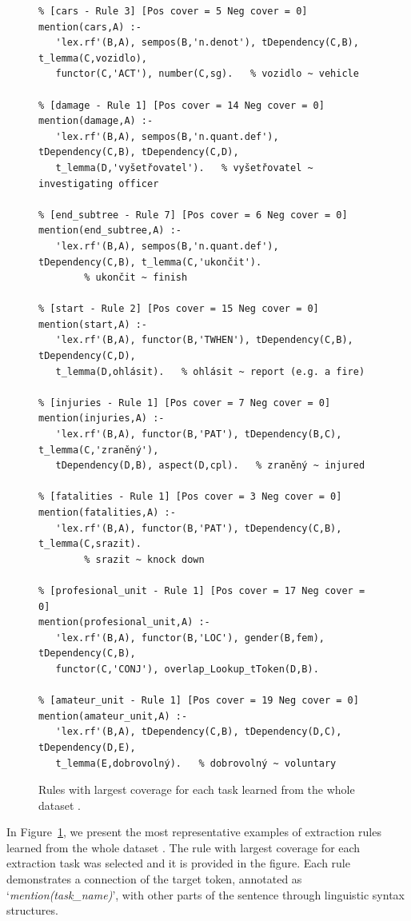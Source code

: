 \begin{figure}
\begin{verbatim}
% [cars - Rule 3] [Pos cover = 5 Neg cover = 0]
mention(cars,A) :-
   'lex.rf'(B,A), sempos(B,'n.denot'), tDependency(C,B), t_lemma(C,vozidlo), 
   functor(C,'ACT'), number(C,sg).   % vozidlo ~ vehicle

% [damage - Rule 1] [Pos cover = 14 Neg cover = 0]
mention(damage,A) :-
   'lex.rf'(B,A), sempos(B,'n.quant.def'), tDependency(C,B), tDependency(C,D), 
   t_lemma(D,'vyšetřovatel').   % vyšetřovatel ~ investigating officer

% [end_subtree - Rule 7] [Pos cover = 6 Neg cover = 0]
mention(end_subtree,A) :-
   'lex.rf'(B,A), sempos(B,'n.quant.def'), tDependency(C,B), t_lemma(C,'ukončit').
	    % ukončit ~ finish

% [start - Rule 2] [Pos cover = 15 Neg cover = 0]
mention(start,A) :-
   'lex.rf'(B,A), functor(B,'TWHEN'), tDependency(C,B), tDependency(C,D), 
   t_lemma(D,ohlásit).   % ohlásit ~ report (e.g. a fire)

% [injuries - Rule 1] [Pos cover = 7 Neg cover = 0]
mention(injuries,A) :-
   'lex.rf'(B,A), functor(B,'PAT'), tDependency(B,C), t_lemma(C,'zraněný'), 
   tDependency(D,B), aspect(D,cpl).   % zraněný ~ injured

% [fatalities - Rule 1] [Pos cover = 3 Neg cover = 0]
mention(fatalities,A) :-
   'lex.rf'(B,A), functor(B,'PAT'), tDependency(C,B), t_lemma(C,srazit).
	    % srazit ~ knock down

% [profesional_unit - Rule 1] [Pos cover = 17 Neg cover = 0]
mention(profesional_unit,A) :-
   'lex.rf'(B,A), functor(B,'LOC'), gender(B,fem), tDependency(C,B), 
   functor(C,'CONJ'), overlap_Lookup_tToken(D,B).

% [amateur_unit - Rule 1] [Pos cover = 19 Neg cover = 0]
mention(amateur_unit,A) :-
   'lex.rf'(B,A), tDependency(C,B), tDependency(D,C), tDependency(D,E), 
   t_lemma(E,dobrovolný).   % dobrovolný ~ voluntary
\end{verbatim}
	\caption{Rules with largest coverage for each task learned from the whole dataset .}
	\label{fig:learning_eval_rules}
\end{figure}

In Figure~\ref{fig:learning_eval_rules}, we present the most representative examples of extraction rules learned from the whole dataset . The rule with largest coverage for each extraction task was selected and it is provided in the figure. Each rule demonstrates a connection of the target token, annotated as `\emph{mention(task\_name)}’, with other parts of the sentence through linguistic syntax structures. 

